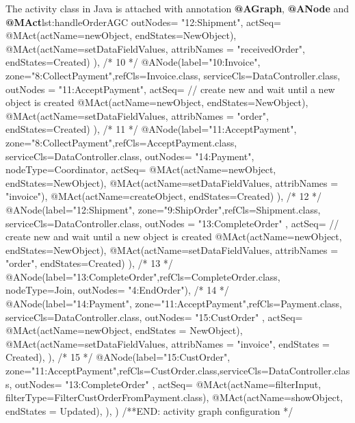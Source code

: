 \begin{lstcodeplainssm}{The activity class  in Java is attached with annotation \textbf{@AGraph}, \textbf{@ANode} and \textbf{@MAct}}{lst:handleOrderAGC}
{	outNodes= {"12:Shipment"},
	actSeq={
		@MAct(actName=newObject, endStates={NewObject}),
		@MAct(actName=setDataFieldValues, attribNames = {"receivedOrder"}, endStates={Created})
	}),
	/* 10 */    
	@ANode(label="10:Invoice", zone="8:CollectPayment",refCls=Invoice.class, serviceCls=DataController.class, 
	outNodes = {"11:AcceptPayment"},
	actSeq={
		// create new and wait until a new object is created
		@MAct(actName=newObject, endStates={NewObject}),
		@MAct(actName=setDataFieldValues, attribNames = {"order"}, endStates={Created})
	}),
	/* 11 */    
	@ANode(label="11:AcceptPayment", zone="8:CollectPayment",refCls=AcceptPayment.class, serviceCls=DataController.class,
	outNodes= {"14:Payment"},
	nodeType=Coordinator,      
	actSeq={
		@MAct(actName=newObject, endStates={NewObject}),
		@MAct(actName=setDataFieldValues, attribNames = {"invoice"}),
		@MAct(actName=createObject, endStates={Created})
	}),
	/* 12 */    
	@ANode(label="12:Shipment", zone="9:ShipOrder",refCls=Shipment.class, serviceCls=DataController.class,
	outNodes = { "13:CompleteOrder" },
	actSeq={
		// create new and wait until a new object is created
		@MAct(actName=newObject, endStates={NewObject}),
		@MAct(actName=setDataFieldValues, attribNames = {"order"}, endStates={Created})
	}),
	/* 13 */    
	@ANode(label="13:CompleteOrder",refCls=CompleteOrder.class, nodeType=Join, 
	outNodes= {"4:EndOrder"}),
	/* 14 */    
	@ANode(label="14:Payment", zone="11:AcceptPayment",refCls=Payment.class, serviceCls=DataController.class, 
	outNodes= { "15:CustOrder" },
	actSeq={
		@MAct(actName=newObject, endStates = {NewObject}),
		@MAct(actName=setDataFieldValues, attribNames = {"invoice"}, endStates = {Created}),
	}),
	/* 15 */    
	@ANode(label="15:CustOrder", zone="11:AcceptPayment",refCls=CustOrder.class,serviceCls=DataController.class,
	outNodes= { "13:CompleteOrder" },
	actSeq={
		@MAct(actName=filterInput, filterType=FilterCustOrderFromPayment.class),
		@MAct(actName=showObject, endStates = {Updated}),
	}),
})
/**END: activity graph configuration */
%
%
\end{lstcodeplainssm}

